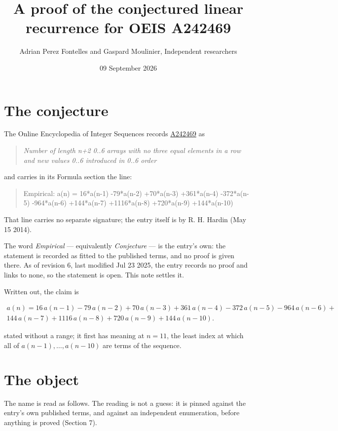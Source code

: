 \documentclass[11pt]{article}
\title{A proof of the conjectured linear recurrence for OEIS A242469}
\author{Adrian Perez Fontelles and Gaspard Moulinier, Independent researchers}
\date{09 September 2026}
\theoremstyle{definition}
\begin{document}
\maketitle
\section{The conjecture}

The Online Encyclopedia of Integer Sequences records \href{https://oeis.org/A242469}{A242469} as

\begin{quote}\itshape Number of length n+2 0..6 arrays with no three equal elements in a row and new values 0..6 introduced in 0..6 order\end{quote}

and carries in its Formula section the line:

\begin{quote}\ttfamily Empirical: a(n) = 16*a(n-1) -79*a(n-2) +70*a(n-3) +361*a(n-4) -372*a(n-5) -964*a(n-6) +144*a(n-7) +1116*a(n-8) +720*a(n-9) +144*a(n-10)\end{quote}

That line carries no separate signature; the entry itself is by R. H. Hardin (May 15 2014).

The word {\itshape Empirical} --- equivalently {\itshape Conjecture} --- is the entry's own: the statement is recorded as fitted to the published terms, and no proof is given there. As of revision 6, last modified Jul 23 2025, the entry records no proof and links to none, so the statement is open. This note settles it.

Written out, the claim is

\begin{multline*} a(n) = 16\,a(n-1) - 79\,a(n-2) + 70\,a(n-3) + 361\,a(n-4) - 372\,a(n-5) - 964\,a(n-6) + \\ 144\,a(n-7) + 1116\,a(n-8) + 720\,a(n-9) + 144\,a(n-10). \end{multline*}

stated without a range; it first has meaning at $n = 11$, the least index at which all of $a(n-1),\dots,a(n-10)$ are terms of the sequence.

\section{The object}

The name is read as follows. The reading is not a guess: it is pinned against the entry's own published terms, and against an independent enumeration, before anything is proved (Section 7).
\end{document}
